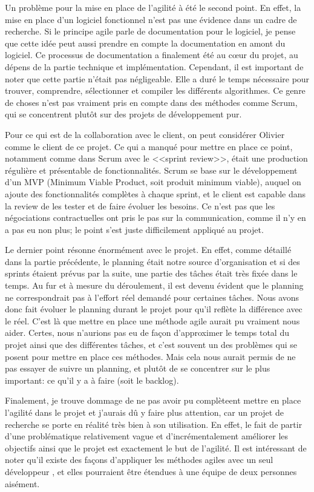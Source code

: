 \documentclass[openany, 11pt]{memoir}
\begin{document}
Un problème pour la mise en place de l'agilité à été le second point. En effet, la mise en place d'un logiciel fonctionnel n'est pas une évidence dans un cadre de recherche. Si le principe agile parle de documentation pour le logiciel, je pense que cette idée peut aussi prendre en compte la documentation en amont du logiciel. Ce processus de documentation a finalement été au cœur du projet, au dépens de la partie technique et implémentation. Cependant, il est important de noter que cette partie n'était pas négligeable. Elle a duré le temps nécessaire pour trouver, comprendre, sélectionner et compiler les différents algorithmes. Ce genre de choses n'est pas vraiment pris en compte dans des méthodes comme Scrum, qui se concentrent plutôt sur des projets de développement pur.

Pour ce qui est de la collaboration avec le client, on peut considérer Olivier comme le client de ce projet. Ce qui a manqué pour mettre en place ce point, notamment comme dans Scrum avec le <<sprint review>>, était une production régulière et présentable de fonctionnalités. Scrum se base sur le développement d'un MVP (Minimum Viable Product, soit produit minimum viable), auquel on ajoute des fonctionnalités complètes à chaque sprint, et le client est capable dans la review de les tester et de faire évoluer les besoins. Ce n'est pas que les négociations contractuelles ont pris le pas sur la communication, comme il n'y en a pas eu non plus; le point s'est juste difficilement appliqué au projet.

Le dernier point résonne énormément avec le projet. En effet, comme détaillé dans la partie précédente, le planning était notre source d'organisation et si des sprints étaient prévus par la suite, une partie des tâches était très fixée dans le temps. Au fur et à mesure du déroulement, il est devenu évident que le planning ne correspondrait pas à l'effort réel demandé pour certaines tâches. Nous avons donc fait évoluer le planning durant le projet pour qu'il reflète la différence avec le réel. C'est là que mettre en place une méthode agile aurait pu vraiment nous aider. Certes, nous n'aurions pas eu de façon d'approximer le temps total du projet ainsi que des différentes tâches, et c'est souvent un des problèmes qui se posent pour mettre en place ces méthodes. Mais cela nous aurait permis de ne pas essayer de suivre un planning, et plutôt de se concentrer sur le plus important: ce qu'il y a à faire (soit le backlog).

\bigskip
Finalement, je trouve dommage de ne pas avoir pu complèteent mettre en place l'agilité dans le projet et j'aurais dû y faire plus attention, car un projet de recherche se porte en réalité très bien à son utilisation. En effet, le fait de partir d'une problématique relativement vague et d'incrémentalement améliorer les objectifs ainsi que le projet est exactement le but de l'agilité. Il est intéressant de noter qu'il existe des façons d'appliquer les méthodes agiles avec un seul développeur \cite{agilesolo} \cite{ssdm}, et elles pourraient être étendues à une équipe de deux personnes aisément.
\end{document}
